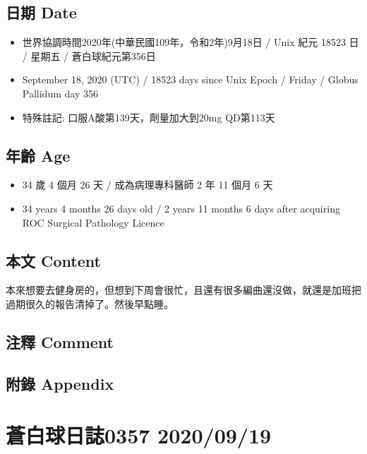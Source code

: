 \documentclass[
]{article}
\providecommand{\tightlist}{%
  \setlength{\itemsep}{0pt}\setlength{\parskip}{0pt}}
\begin{document}
\hypertarget{ux65e5ux671f-date-17}{%
\subsection{日期 Date}\label{ux65e5ux671f-date-17}}

\begin{itemize}
\tightlist
\item
  世界協調時間2020年(中華民國109年，令和2年)9月18日 / Unix 紀元 18523 日
  / 星期五 / 蒼白球紀元第356日
\item
  September 18, 2020 (UTC) / 18523 days since Unix Epoch / Friday /
  Globus Pallidum day 356
\item
  特殊註記: 口服A酸第139天，劑量加大到20mg QD第113天
\end{itemize}

\hypertarget{ux5e74ux9f61-age-17}{%
\subsection{年齡 Age}\label{ux5e74ux9f61-age-17}}

\begin{itemize}
\tightlist
\item
  34 歲 4 個月 26 天 / 成為病理專科醫師 2 年 11 個月 6 天
\item
  34 years 4 months 26 days old / 2 years 11 months 6 days after
  acquiring ROC Surgical Pathology Licence
\end{itemize}

\hypertarget{ux672cux6587-content-17}{%
\subsection{本文 Content}\label{ux672cux6587-content-17}}

本來想要去健身房的，但想到下周會很忙，且還有很多編曲還沒做，就還是加班把過期很久的報告清掉了。然後早點睡。

\hypertarget{ux6ce8ux91cb-comment-17}{%
\subsection{注釋 Comment}\label{ux6ce8ux91cb-comment-17}}

\hypertarget{ux9644ux9304-appendix-17}{%
\subsection{附錄 Appendix}\label{ux9644ux9304-appendix-17}}

\hypertarget{ux84bcux767dux7403ux65e5ux8a8c0357-20200919}{%
\section{蒼白球日誌0357
2020/09/19}\label{ux84bcux767dux7403ux65e5ux8a8c0357-20200919}}
\end{document}

